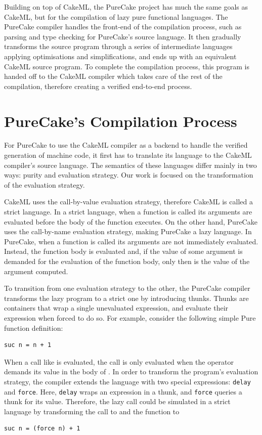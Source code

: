Building on top of CakeML, the PureCake project \cite{PureCake} has much the
same goals as CakeML, but for the compilation of lazy pure functional languages.
The PureCake compiler handles the front-end of the compilation process, such as
parsing and type checking for PureCake's source language. It then gradually
transforms the source program through a series of intermediate languages
applying optimisations and simplifications, and ends up with an equivalent
CakeML source program. To complete the compilation process, this program is
handed off to the CakeML compiler which takes care of the rest of the
compilation, therefore creating a verified end-to-end process.

\section{PureCake's Compilation Process}

For PureCake to use the CakeML compiler as a backend to handle the verified
generation of machine code, it first has to translate its language to the CakeML
compiler's source language. The semantics of these languages differ mainly in
two ways: purity and evaluation strategy. Our work is focused on the
transformation of the evaluation strategy.

CakeML uses the call-by-value evaluation strategy, therefore CakeML is called a
strict language. In a strict language, when a function is called its arguments
are evaluated before the body of the function executes. On the other hand,
PureCake uses the call-by-name evaluation strategy, making PureCake a lazy
language. In PureCake, when a function is called its arguments are not
immediately evaluated. Instead, the function body is evaluated and, if the value
of some argument is demanded for the evaluation of the function body, only then
is the value of the argument computed.

To transition from one evaluation strategy to the other, the PureCake compiler
transforms the lazy program to a strict one by introducing thunks. Thunks are
containers that wrap a single unevaluated expression, and evaluate their
expression when forced to do so. For example, consider the following simple Pure
function definition:
\begin{verbatim}
suc n = n + 1
\end{verbatim}
When a call like  is
evaluated, the  call is only evaluated when the \hsinl{+} operator
demands its value in the body of . In order to transform the
program's evaluation strategy, the compiler extends the language with two
special expressions: \texttt{delay} and \texttt{force}. Here, \texttt{delay}
wraps an expression in a thunk, and \texttt{force} queries a thunk for its
value. Therefore, the  lazy call could be simulated in a strict
language by transforming the call to  and the function
to
\begin{verbatim}
suc n = (force n) + 1
\end{verbatim}

